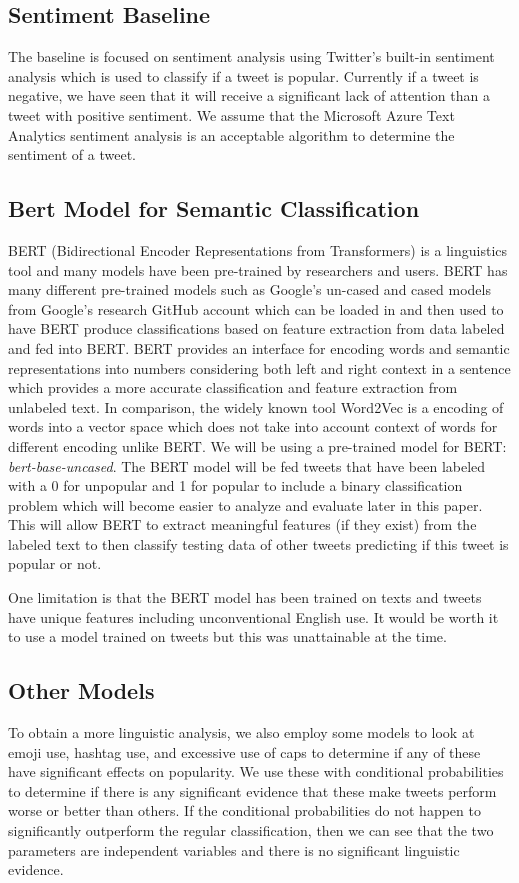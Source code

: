\documentclass{article}
\begin{document}
\subsection{Sentiment Baseline}
The baseline is focused on sentiment analysis using Twitter's built-in sentiment analysis which is used to classify if a tweet is popular. 
Currently if a tweet is negative, we have seen that it will receive a significant lack of attention than a tweet with positive sentiment.
We assume that the Microsoft Azure Text Analytics sentiment analysis is an acceptable algorithm to determine the sentiment of a tweet. 

\subsection{Bert Model for Semantic Classification}
BERT (Bidirectional Encoder Representations from Transformers) \cite{DBLP} is a linguistics tool and many models have been pre-trained by researchers and users. BERT has many different pre-trained models such as Google's un-cased and cased models from Google's research GitHub account \cite{turc2019} which can be loaded in and then used to have BERT produce 
classifications based on feature extraction from data labeled and fed into BERT. 
BERT provides an interface for encoding words and semantic representations into numbers considering 
both left and right context in a sentence which provides a more accurate classification and feature extraction from unlabeled text. 
In comparison, the widely known tool Word2Vec \cite{word2vec} is a encoding of words into a vector space which does not take into account context of words for different encoding unlike BERT.
We will be using a pre-trained model for BERT: \textit{bert-base-uncased}.
The BERT model will be fed tweets that have been labeled with a 0 for unpopular and 1 for popular to include a binary classification problem which will become easier to analyze and evaluate later in this paper.
This will allow BERT to extract meaningful features (if they exist) from the 
labeled text to then classify testing data of other tweets predicting if this tweet is popular or not.

One limitation is that the BERT model has been trained on texts and tweets have unique features including unconventional English use. It would be worth it to use a model trained on tweets but this was unattainable at the time.

\subsection{Other Models}
To obtain a more linguistic analysis, we also employ some models to look at emoji use, hashtag use, and excessive use of caps to determine if any of these have significant effects on popularity. 
We use these with conditional probabilities to determine if there is any significant evidence that these make tweets perform worse or better than others.
If the conditional probabilities do not happen to significantly outperform the regular classification, then we can see that the two parameters are independent variables and there is no significant linguistic evidence.
\end{document}
